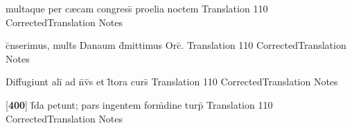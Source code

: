 \latline
  {multaque per c{\ae}cam congress\={\macron {\i}} proelia noctem}
  { Translation }
  {110}
  { CorrectedTranslation }
  { Notes }


\latline
  {c\={}nserimus, mult\={}s Danaum d\={}mittimus Orc\={}.}
  { Translation }
  {110}
  { CorrectedTranslation }
  { Notes }


\latline
  {Diffugiunt ali\={\macron {\i}} ad n\={}v\={\macron {\i}}s et l\={\macron {\i}}tora curs\={}}
  { Translation }
  {110}
  { CorrectedTranslation }
  { Notes }


\latline
  {[\textbf{400}] f\={\macron {\i}}da petunt; pars ingentem form\={\macron {\i}}dine turp\={\macron {\i}}}
  { Translation }
  {110}
  { CorrectedTranslation }
  { Notes }


